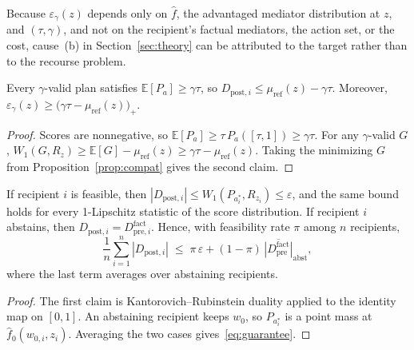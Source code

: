 \noindent Because $\varepsilon_\gamma(z)$ depends only on $\hat f$, the
advantaged mediator distribution at $z$, and $(\tau,\gamma)$, and not on the
recipient's factual mediators, the action set, or the cost, cause~(b) in
Section~\ref{sec:theory} can be attributed to the target rather than to the
recourse problem.

\begin{proposition}
\label{prop:overshoot}
Every $\gamma$-valid plan satisfies $\mathbb E[P_a]\ge\gamma\tau$, so
$D_{\mathrm{post},i}\le\mu_{\mathrm{ref}}(z)-\gamma\tau$. Moreover,
$\varepsilon_\gamma(z)\ge\bigl(\gamma\tau-\mu_{\mathrm{ref}}(z)\bigr)_+$.
\end{proposition}

\begin{proof}
Scores are nonnegative, so
$\mathbb E[P_a]\ge\tau\,P_a([\tau,1])\ge\gamma\tau$. For any $\gamma$-valid $G$,
$W_1(G,R_z)\ge\mathbb E[G]-\mu_{\mathrm{ref}}(z)\ge\gamma\tau-\mu_{\mathrm{ref}}(z)$.
Taking the minimizing $G$ from Proposition~\ref{prop:compat} gives the
second claim.
\end{proof}

\begin{proposition}
\label{prop:guarantee}
If recipient $i$ is feasible, then
$|D_{\mathrm{post},i}|\le W_1(P_{a^*_i},R_{z_i})\le\varepsilon$, and the same bound
holds for every 1-Lipschitz statistic of the score distribution. If recipient
$i$ abstains, then $D_{\mathrm{post},i}=D^{\mathrm{fact}}_{\mathrm{pre},i}$.
Hence, with feasibility rate $\pi$ among $n$ recipients,
\begin{equation}
  \frac1n\sum_{i=1}^n|D_{\mathrm{post},i}|
  \;\le\;\pi\,\varepsilon+(1-\pi)\,
  \overline{|D^{\mathrm{fact}}_{\mathrm{pre}}|}_{\mathrm{abst}},
  \label{eq:guarantee}
\end{equation}
where the last term averages over abstaining recipients.
\end{proposition}

\begin{proof}
The first claim is Kantorovich--Rubinstein duality applied to the identity map
on $[0,1]$. An abstaining recipient keeps $w_0$, so $P_{a^*_i}$ is a point mass
at $\hat f_0(w_{0,i},z_i)$. Averaging the two cases gives~\eqref{eq:guarantee}.
\end{proof}

